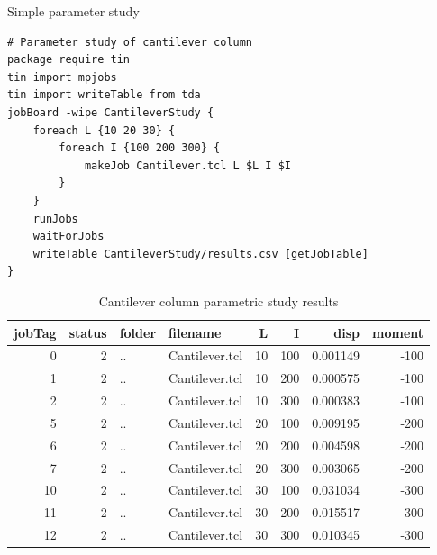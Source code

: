 \documentclass{article}
\renewcommand{\^}[1]{\textsuperscript{#1}}
\renewcommand{\_}[1]{\textsubscript{#1}}
\begin{document}
\begin{example}{Simple parameter study}
\begin{lstlisting}
# Parameter study of cantilever column
package require tin
tin import mpjobs
tin import writeTable from tda
jobBoard -wipe CantileverStudy {
    foreach L {10 20 30} {
        foreach I {100 200 300} {
            makeJob Cantilever.tcl L $L I $I
        }
    }
    runJobs
    waitForJobs
    writeTable CantileverStudy/results.csv [getJobTable]
}
\end{lstlisting}
\end{example}
\begin{table}[htbp]
\centering
\caption{Cantilever column parametric study results}
\begin{tabular}{rrllrrrr}
    \toprule
    jobTag & status & folder & filename       &  L &   I &     disp & moment \\
    \midrule
         0 &      2 & ..     & Cantilever.tcl & 10 & 100 & 0.001149 &   -100 \\
         1 &      2 & ..     & Cantilever.tcl & 10 & 200 & 0.000575 &   -100 \\
         2 &      2 & ..     & Cantilever.tcl & 10 & 300 & 0.000383 &   -100 \\
         5 &      2 & ..     & Cantilever.tcl & 20 & 100 & 0.009195 &   -200 \\
         6 &      2 & ..     & Cantilever.tcl & 20 & 200 & 0.004598 &   -200 \\
         7 &      2 & ..     & Cantilever.tcl & 20 & 300 & 0.003065 &   -200 \\
        10 &      2 & ..     & Cantilever.tcl & 30 & 100 & 0.031034 &   -300 \\
        11 &      2 & ..     & Cantilever.tcl & 30 & 200 & 0.015517 &   -300 \\
        12 &      2 & ..     & Cantilever.tcl & 30 & 300 & 0.010345 &   -300 \\
    \bottomrule
\end{tabular}%
\label{tbl:job_cantilever_results}
\end{table}
\end{document}
